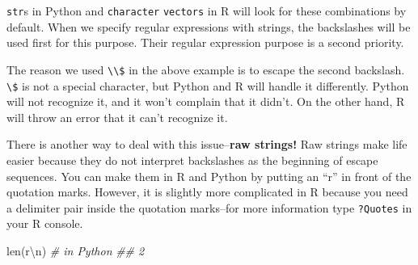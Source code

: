 \documentclass[
  12pt,
  krantz2]{krantz}
\makeatletter
\newenvironment{Shaded}{\begin{snugshade}}{\end{snugshade}}
\newcommand{\BuiltInTok}[1]{#1}
\newcommand{\CommentTok}[1]{\textcolor[rgb]{0.37,0.37,0.37}{\textit{#1}}}
\newcommand{\DocumentationTok}[1]{\textcolor[rgb]{0.37,0.37,0.37}{\textbf{\textit{#1}}}}
\newcommand{\FunctionTok}[1]{\textcolor[rgb]{0,0,0}{#1}}
\newcommand{\NormalTok}[1]{#1}
\newcommand{\StringTok}[1]{\textcolor[rgb]{0.5,0.5,0.5}{#1}}
\newcommand{\VerbatimStringTok}[1]{\textcolor[rgb]{0.5,0.5,0.5}{#1}}
\newenvironment{kframe}{%
\medskip{}
\setlength{\fboxsep}{.8em}
 \def\at@end@of@kframe{}%
 \ifinner\ifhmode%
  \def\at@end@of@kframe{\end{minipage}}%
  \begin{minipage}{\columnwidth}%
 \fi\fi%
 \def\FrameCommand##1{\hskip\@totalleftmargin \hskip-\fboxsep
 \colorbox{shadecolor}{##1}\hskip-\fboxsep
     \hskip-\linewidth \hskip-\@totalleftmargin \hskip\columnwidth}%
 \MakeFramed {\advance\hsize-\width
   \@totalleftmargin\z@ \linewidth\hsize
   \@setminipage}}%
 {\par\unskip\endMakeFramed%
 \at@end@of@kframe}
\renewenvironment{Shaded}{\begin{kframe}}{\end{kframe}}
\makeatother
\begin{document}
\texttt{str}s in Python and \texttt{character} \texttt{vectors} in R will look for these combinations by default. When we specify regular expressions with strings, the backslashes will be used first for this purpose. Their regular expression purpose is a second priority.

The reason we used \texttt{\textbackslash{}\textbackslash{}\$} in the above example is to escape the second backslash. \texttt{\textbackslash{}\$} is not a special character, but Python and R will handle it differently. Python will not recognize it, and it won't complain that it didn't. On the other hand, R will throw an error that it can't recognize it.

\begin{Shaded}
\end{Shaded}

\begin{Shaded}
\end{Shaded}

There is another way to deal with this issue--\textbf{raw strings!} Raw strings make life easier because they do not interpret backslashes as the beginning of escape sequences. You can make them in R and Python by putting an ``r'' in front of the quotation marks. However, it is slightly more complicated in R because you need a delimiter pair inside the quotation marks--for more information type \texttt{?Quotes} in your R console.

\begin{Shaded}
\begin{Highlighting}[]
\BuiltInTok{len}\NormalTok{(}\VerbatimStringTok{r\textquotesingle{}\textbackslash{}n\textquotesingle{}}\NormalTok{) }\CommentTok{\# in Python }
\CommentTok{\#\# 2}
\end{Highlighting}
\end{Shaded}
\end{document}
